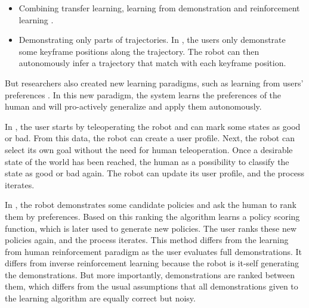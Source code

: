 \begin{itemize}
\item Combining transfer learning, learning from demonstration and reinforcement learning \cite{taylor2011integrating}.

\item Demonstrating only parts of trajectories. In \cite{akgun12hri}, the users only demonstrate some keyframe positions along the trajectory. The robot can then autonomously infer a trajectory that match with each keyframe position.

\end{itemize}

But researchers also created new learning paradigms, such as learning from users' preferences \cite{Mason2011,akrour2011preference}. In this new paradigm, the system learns the preferences of the human and will pro-actively generalize and apply them autonomously.

In \cite{Mason2011}, the user starts by teleoperating the robot and can mark some states as good or bad. From this data, the robot can create a user profile. Next, the robot can select its own goal without the need for human teleoperation. Once a desirable state of the world has been reached, the human as a possibility to classify the state as good or bad again. The robot can update its user profile, and the process iterates.


In \cite{akrour2011preference,akrour2012april,akrour2014programming,wilson2012bayesian}, the robot demonstrates some candidate policies and ask the human to rank them by preferences. Based on this ranking the algorithm learns a policy scoring function, which is later used to generate new policies. The user ranks these new policies again, and the process iterates. This method differs from the learning from human reinforcement paradigm as the user evaluates full demonstrations. It differs from inverse reinforcement learning because the robot is it-self generating the demonstrations. But more importantly, demonstrations are ranked between them, which differs from the usual assumptions that all demonstrations given to the learning algorithm are equally correct but noisy.



